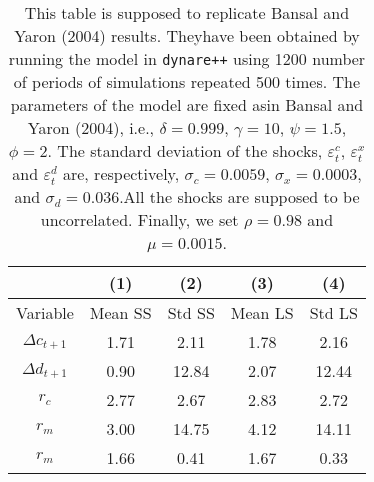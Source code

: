 \begin{table}[h!]
\captionsetup{font=small, width=0.75\textwidth}
\caption{This table is supposed to replicate Bansal and Yaron (2004) results. Theyhave been obtained by running the model in \texttt{dynare++} using 1200 number of periods of simulations repeated 500 times. The parameters of the model are fixed asin Bansal and Yaron (2004), i.e., $\delta = 0.999$, $\gamma = 10$, $\psi = 1.5$, $\phi = 2$. The standard deviation of the shocks, $\varepsilon_t^c$, $\varepsilon_t^x$ and $\varepsilon_t^d$ are, respectively, $\sigma_c = 0.0059$, $\sigma_x = 0.0003$, and $\sigma_d = 0.036$.All the shocks are supposed to be uncorrelated. Finally, we set $\rho = 0.98$ and $\mu = 0.0015$.} \vspace{0.25cm}
\centering
\def\arraystretch{1.5}
\begin{tabular}{ccccc}
& (1) & (2) & (3) & (4) \\        
\hline
Variable & Mean SS & Std SS & Mean LS & Std LS \\
\hline
$\Delta c_{t+1}$ & 1.71 &  2.11 & 1.78 &  2.16 \\  
$\Delta d_{t+1}$ & 0.90 & 12.84 & 2.07 & 12.44 \\  
$r_{c}$ & 2.77 &  2.67 & 2.83 &  2.72 \\  
$r_m$ & 3.00 & 14.75 & 4.12 & 14.11 \\  
$r_m$ & 1.66 &  0.41 & 1.67 &  0.33 \\  
\hline
\end{tabular}
\end{table}

